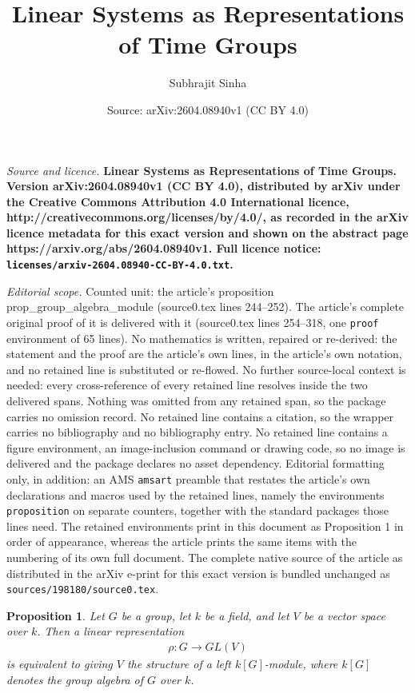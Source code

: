 \documentclass[10pt,a4paper]{amsart}
\title{\LARGE \bf Linear Systems as Representations of Time Groups}
\author{Subhrajit Sinha}
\date{Source: arXiv:2604.08940v1 (CC BY 4.0)}
\newtheorem{proposition}{Proposition}
\begin{document}
\maketitle

\noindent\emph{Source and licence.} \LARGE \bf Linear Systems as Representations of Time Groups. Version arXiv:2604.08940v1 (CC BY 4.0), distributed by arXiv under the Creative Commons Attribution 4.0 International licence, http://creativecommons.org/licenses/by/4.0/, as recorded in the arXiv licence metadata for this exact version and shown on the abstract page https://arxiv.org/abs/2604.08940v1. Full licence notice: \texttt{licenses/arxiv-2604.08940-CC-BY-4.0.txt}.\par\smallskip

\noindent\textit{Editorial scope.} Counted unit: the article's proposition prop\_group\_algebra\_module (source0.tex lines 244--252). The article's complete original proof of it is delivered with it (source0.tex lines 254--318, one \texttt{proof} environment of 65 lines). No mathematics is written, repaired or re-derived: the statement and the proof are the article's own lines, in the article's own notation, and no retained line is substituted or re-flowed.  No further source-local context is needed: every cross-reference of every retained line resolves inside the two delivered spans.  Nothing was omitted from any retained span, so the package carries no omission record.  No retained line contains a citation, so the wrapper carries no bibliography and no bibliography entry.  No retained line contains a figure environment, an image-inclusion command or drawing code, so no image is delivered and the package declares no asset dependency.  Editorial formatting only, in addition: an AMS \texttt{amsart} preamble that restates the article's own declarations and macros used by the retained lines, namely the environments \texttt{proposition} on separate counters, together with the standard packages those lines need.  The retained environments print in this document as Proposition 1 in order of appearance, whereas the article prints the same items with the numbering of its own full document.  The complete native source of the article as distributed in the arXiv e-print for this exact version is bundled unchanged as \texttt{sources/198180/source0.tex}.
\begin{proposition}\label{prop_group_algebra_module}
Let $G$ be a group, let $k$ be a field, and let $V$ be a vector space over $k$.
Then a linear representation
\begin{eqnarray}
\rho:G \to GL(V)
\end{eqnarray}
is equivalent to giving $V$ the structure of a left $k[G]$-module, where
$k[G]$ denotes the group algebra of $G$ over $k$.
\end{proposition}
\end{document}
